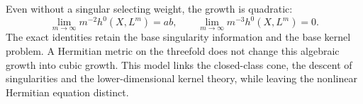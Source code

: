 Even without a singular selecting weight, the growth is quadratic:
\[
 \lim_{m\to\infty}m^{-2}h^0(X,L^m)=ab,
 \qquad \lim_{m\to\infty}m^{-3}h^0(X,L^m)=0.
\]
The exact identities retain the base singularity information and the base kernel problem. A Hermitian metric on the threefold does not change this algebraic growth into cubic growth. This model links the closed-class cone, the descent of singularities and the lower-dimensional kernel theory, while leaving the nonlinear Hermitian equation distinct.
